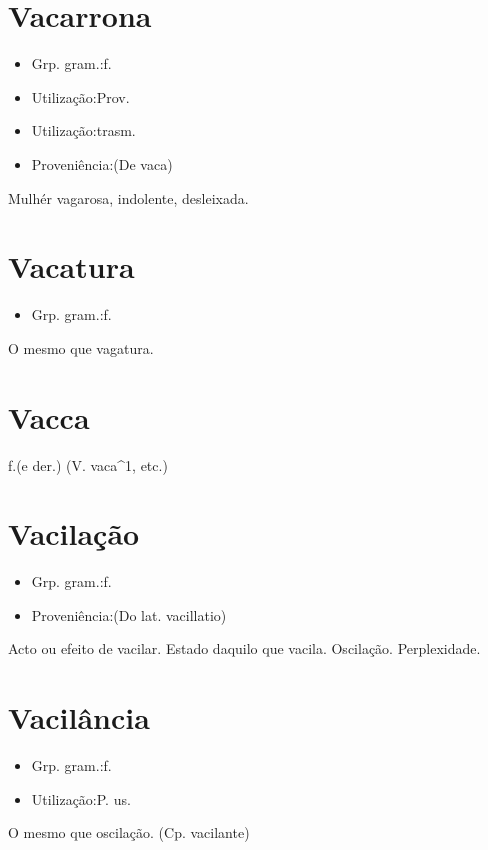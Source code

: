 \documentclass{article}
\begin{document}
\section{Vacarrona}
\begin{itemize}
\item {Grp. gram.:f.}
\end{itemize}
\begin{itemize}
\item {Utilização:Prov.}
\end{itemize}
\begin{itemize}
\item {Utilização:trasm.}
\end{itemize}
\begin{itemize}
\item {Proveniência:(De \textunderscore vaca\textunderscore )}
\end{itemize}
Mulhér vagarosa, indolente, desleixada.
\section{Vacatura}
\begin{itemize}
\item {Grp. gram.:f.}
\end{itemize}
O mesmo que \textunderscore vagatura\textunderscore .
\section{Vacca}
\textunderscore f.\textunderscore  (e der.)
(V. \textunderscore vaca\textunderscore ^1, etc.)
\section{Vacilação}
\begin{itemize}
\item {Grp. gram.:f.}
\end{itemize}
\begin{itemize}
\item {Proveniência:(Do lat. \textunderscore vacillatio\textunderscore )}
\end{itemize}
Acto ou efeito de vacilar.
Estado daquilo que vacila.
Oscilação.
Perplexidade.
\section{Vacilância}
\begin{itemize}
\item {Grp. gram.:f.}
\end{itemize}
\begin{itemize}
\item {Utilização:P. us.}
\end{itemize}
O mesmo que \textunderscore oscilação\textunderscore .
(Cp. \textunderscore vacilante\textunderscore )
\end{document}
